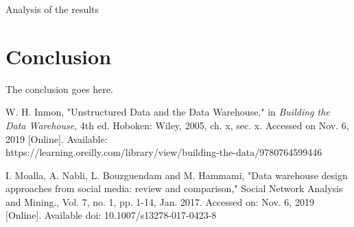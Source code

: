 \documentclass[journal]{IEEEtran}
\begin{document}
Analysis of the results


\section{Conclusion}

The conclusion goes here.

\ifCLASSOPTIONcaptionsoff
  \newpage
\fi

\begin{thebibliography}{1}

W. H. Inmon, "Unstructured Data and the Data Warehouse," in 
  \emph{Building the Data Warehouse},
  4th ed. Hoboken: Wiley, 2005, ch. x, sec. x.
  Accessed on Nov. 6, 2019 [Online]. 
  Available: \\ https://learning.oreilly.com/library/view/building-the-data/9780764599446

I. Moalla, A. Nabli, L. Bouzguendam and M. Hammami,
 "Data warehouse design approaches from social media: review and comparison,"
 Social Network Analysis and Mining., Vol. 7, no. 1, pp. 1-14, Jan. 2017.
 Accessed on: Nov. 6, 2019 [Online]. Available doi: 10.1007/s13278-017-0423-8

\end{thebibliography}


\end{document}
